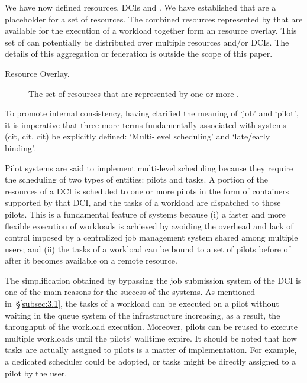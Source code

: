 \documentclass{sig-alternate}
\begin{document}
We have now defined resources, DCIs and \pilots.
We have established that \pilots are a placeholder for a set of resources.
The combined resources represented by \pilots that are available for the
execution of a workload together form an resource overlay.
This set of \pilots can potentially be distributed over multiple resources
and/or DCIs. The details of this aggregation or federation is outside the scope
of this paper.

\begin{description}
\item[Resource Overlay.] The set of resources that are represented by one or more \pilots.
\end{description}

To promote internal consistency, having clarified the meaning of `job'
and `pilot', it is imperative that three more terms fundamentally
associated with \pilot systems (cit, cit, cit) be explicitly defined:
`Multi-level scheduling' and `late/early binding'.

Pilot systems are said to implement multi-level scheduling because they
require the scheduling of two types of entities: pilots and tasks. A
portion of the resources of a DCI is scheduled to one or more pilots in
the form of containers supported by that DCI, and the tasks of a
workload are dispatched to those pilots. This is a fundamental feature of
\pilot systems because (i) a faster and more flexible execution of
workloads is achieved by avoiding the overhead and lack of control
imposed by a centralized job management system shared among multiple
users; and (ii) the tasks of a workload can be bound to a set of
pilots before of after it becomes available on a remote resource.

The simplification obtained by bypassing the job submission system of
the DCI is one of the main reasons for the success of the \pilot
systems. As mentioned in~\S\ref{subsec:3.1}, the tasks of a workload can
be executed on a pilot without waiting in the queue system of the
infrastructure increasing, as a result, the throughput of the workload
execution. Moreover, pilots can be reused to execute multiple workloads
until the pilots' walltime expire. It should be noted that how tasks are
actually assigned to pilots is a matter of implementation. For example,
a dedicated scheduler could be adopted, or tasks might be directly
assigned to a pilot by the user.
\end{document}
